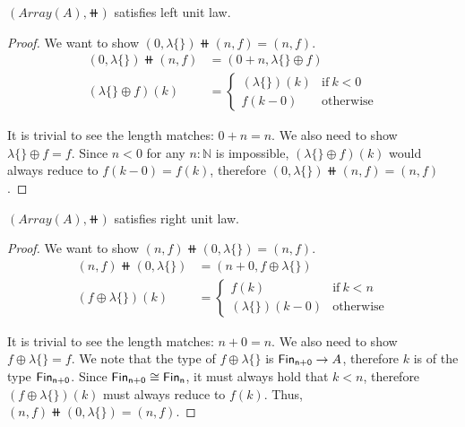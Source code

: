 \begin{proposition}\label{array:unitl}
$(Array(A), \doubleplus)$ satisfies left unit law.
\end{proposition}

\begin{proof}
We want to show $(0, \lambda\{\}) \doubleplus (n, f) = (n, f)$.
\begin{align*}
    (0 , \lambda\{\}) \doubleplus (n , f) & = (0 + n , \lambda\{\} \oplus f) \\
    (\lambda\{\} \oplus f)(k) & = \begin{cases}
      (\lambda\{\})(k) & \text{if}\ k < 0 \\
      f(k - 0) & \text{otherwise}
    \end{cases}
\end{align*} 

It is trivial to see the length matches: $0 + n = n$. We also need to show $\lambda\{\} \oplus f = f$.
Since $n < 0$ for any $n : \mathbb{N}$ is impossible, $(\lambda\{\} \oplus f)(k)$ would always reduce to
$f(k - 0) = f(k)$, therefore $(0, \lambda\{\}) \doubleplus (n, f) = (n, f)$.
\end{proof}

\begin{proposition}
$(Array(A), \doubleplus)$ satisfies right unit law.
\end{proposition}

\begin{proof}
We want to show $(n, f) \doubleplus (0, \lambda\{\}) = (n, f)$.
\begin{align*}
    (n, f) \doubleplus (0 , \lambda\{\}) & = (n + 0, f \oplus \lambda\{\}) \\
    (f \oplus \lambda\{\})(k) & = \begin{cases}
      f(k) & \text{if}\ k < n \\
      (\lambda\{\})(k - 0) & \text{otherwise}
    \end{cases}
\end{align*} 

It is trivial to see the length matches: $n + 0 = n$. We also need to show $f \oplus \lambda\{\} = f$.
We note that the type of $f \oplus \lambda\{\}$ is $\Fin[n + 0] \to A$, therefore $k$ is of the type $\Fin[n + 0]$.
Since $\Fin[n+0] \cong \Fin[n]$, it must always hold that $k < n$, therefore $(f \oplus \lambda\{\})(k)$ must
always reduce to $f(k)$. Thus, $(n, f) \doubleplus (0, \lambda\{\}) = (n, f)$.
\end{proof}


